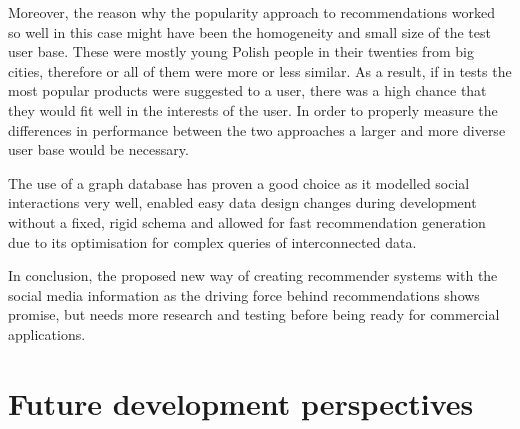 \documentclass[12pt]{report}
\begin{document}
Moreover, the reason why the popularity approach to recommendations worked so well in this case might have been the homogeneity and small size of the test user base. These were mostly young Polish people in their twenties from big cities, therefore or all of them were more or less similar. As a result, if in tests the most popular products were suggested to a user, there was a high chance that they would fit well in the interests of the user. In order to properly measure the differences in performance between the two approaches a larger and more diverse user base would be necessary.

The use of a graph database has proven a good choice as it modelled social interactions very well, enabled easy data design changes during development without a fixed, rigid schema and allowed for fast recommendation generation due to its optimisation for complex queries of interconnected data.

In conclusion, the proposed new way of creating recommender systems with the social media information as the driving force behind recommendations shows promise, but needs more research and testing before being ready for commercial applications.

\section{Future development perspectives}









\end{document}
